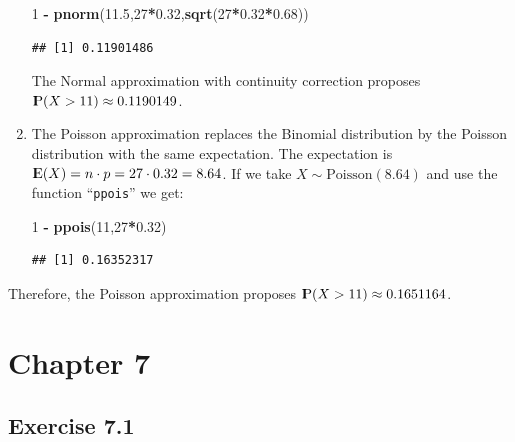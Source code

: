 \documentclass[]{krantz}
\makeatletter
\newenvironment{Shaded}{\begin{snugshade}}{\end{snugshade}}
\newcommand{\DecValTok}[1]{\textcolor[rgb]{0.00,0.00,0.81}{#1}}
\newcommand{\FloatTok}[1]{\textcolor[rgb]{0.00,0.00,0.81}{#1}}
\newcommand{\KeywordTok}[1]{\textcolor[rgb]{0.13,0.29,0.53}{\textbf{#1}}}
\newcommand{\NormalTok}[1]{#1}
\newcommand{\OperatorTok}[1]{\textcolor[rgb]{0.81,0.36,0.00}{\textbf{#1}}}
\newcommand{\StringTok}[1]{\textcolor[rgb]{0.31,0.60,0.02}{#1}}
\newcommand{\Expec}{{\rm I\kern-.3em E}}
\newcommand{\Prob}{{\rm I\kern-.3em P}}
\newenvironment{kframe}{%
\medskip{}
\setlength{\fboxsep}{.8em}
 \def\at@end@of@kframe{}%
 \ifinner\ifhmode%
  \def\at@end@of@kframe{\end{minipage}}%
  \begin{minipage}{\columnwidth}%
 \fi\fi%
 \def\FrameCommand##1{\hskip\@totalleftmargin \hskip-\fboxsep
 \colorbox{shadecolor}{##1}\hskip-\fboxsep
     \hskip-\linewidth \hskip-\@totalleftmargin \hskip\columnwidth}%
 \MakeFramed {\advance\hsize-\width
   \@totalleftmargin\z@ \linewidth\hsize
   \@setminipage}}%
 {\par\unskip\endMakeFramed%
 \at@end@of@kframe}
\renewenvironment{Shaded}{\begin{kframe}}{\end{kframe}}
\theoremstyle{definition}
\theoremstyle{definition}
\theoremstyle{definition}
\theoremstyle{remark}
\makeatother
\begin{document}
\begin{enumerate}
\begin{Shaded}
\begin{Highlighting}[]
\DecValTok{1} \OperatorTok{-}\StringTok{ }\KeywordTok{pnorm}\NormalTok{(}\FloatTok{11.5}\NormalTok{,}\DecValTok{27}\OperatorTok{*}\FloatTok{0.32}\NormalTok{,}\KeywordTok{sqrt}\NormalTok{(}\DecValTok{27}\OperatorTok{*}\FloatTok{0.32}\OperatorTok{*}\FloatTok{0.68}\NormalTok{))}
\end{Highlighting}
\end{Shaded}

\begin{verbatim}
## [1] 0.11901486
\end{verbatim}

  The Normal approximation with continuity correction proposes
  \(\Prob(X > 11) \approx 0.1190149\).
\item
  The Poisson approximation replaces the
  Binomial distribution by the Poisson distribution with the same
  expectation. The expectation is
  \(\Expec(X) = n \cdot p = 27 \cdot 0.32 = 8.64\). If we take
  \(X \sim \mbox{Poisson}(8.64)\) and use the function ``\texttt{ppois}'' we get:

\begin{Shaded}
\begin{Highlighting}[]
\DecValTok{1} \OperatorTok{-}\StringTok{ }\KeywordTok{ppois}\NormalTok{(}\DecValTok{11}\NormalTok{,}\DecValTok{27}\OperatorTok{*}\FloatTok{0.32}\NormalTok{)}
\end{Highlighting}
\end{Shaded}

\begin{verbatim}
## [1] 0.16352317
\end{verbatim}
\end{enumerate}

Therefore, the Poisson approximation proposes
\(\Prob(X > 11) \approx 0.1651164\).

\hypertarget{chapter-7}{%
\section*{Chapter 7}\label{chapter-7}}


\hypertarget{exercise-7.1}{%
\subsection*{Exercise 7.1}\label{exercise-7.1}}
\end{document}
